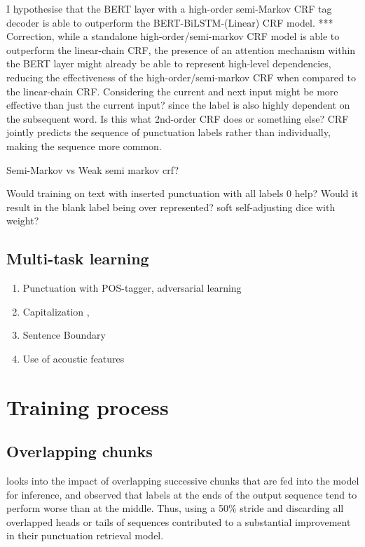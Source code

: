\documentclass[a4paper]{article}
\begin{document}
\begin{multicols}{2}
I hypothesise that the BERT layer with a high-order semi-Markov CRF tag decoder is able to outperform the BERT-BiLSTM-(Linear) CRF model. *** Correction, while a standalone high-order/semi-markov CRF model is able to outperform the linear-chain CRF, the presence of an attention mechanism within the BERT layer might already be able to represent high-level dependencies, reducing the effectiveness of the high-order/semi-markov CRF when compared to the linear-chain CRF. Considering the current and next input might be more effective than just the current input? since the label is also highly dependent on the subsequent word. Is this what 2nd-order CRF does or something else? CRF jointly predicts the sequence of punctuation labels rather than individually, making the sequence more common.

Semi-Markov vs Weak semi markov crf?

Would training on text with inserted punctuation with all labels 0 help? Would it result in the blank label being over represented? soft self-adjusting dice with weight?

\subsection{Multi-task learning}
\begin{enumerate}
\item Punctuation with POS-tagger, adversarial learning \citep{adversarial}

\item Capitalization \citep{jointlearningcorrbirnn}, \citep{chunkmerging}

\item Sentence Boundary \cite{dynamiccrf}

\item Use of acoustic features
\end{enumerate}

\section{Training process}
\subsection{Overlapping chunks}
\citet{chunkmerging} looks into the impact of overlapping successive chunks that are fed into the model for inference, and observed that labels at the ends of the output sequence tend to perform worse than at the middle. Thus, using a 50\% stride and discarding all overlapped heads or tails of sequences contributed to a substantial improvement in their punctuation retrieval model.

\end{multicols}
\end{document}
